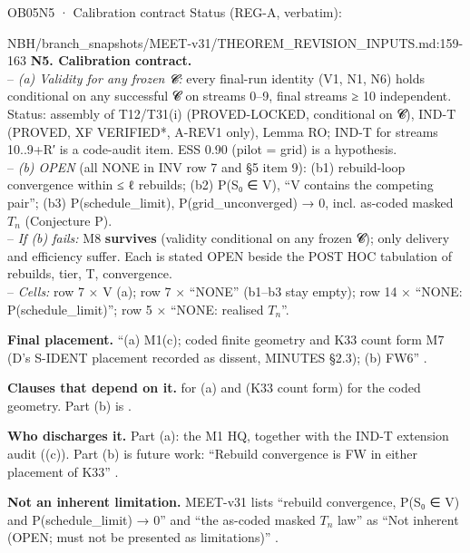 \begin{card}{OB05}{N5 · Calibration contract}
Status (REG-A, verbatim):  
\begin{stmt}{NBH/branch_snapshots/MEET-v31/THEOREM_REVISION_INPUTS.md:159-163}
\textbf{N5. Calibration contract.}\\
– \emph{(a) Validity for any frozen 𝓒:} every final-run identity (V1, N1, N6) holds conditional on any successful 𝓒 on streams 0–9, final streams ≥ 10 independent. Status: assembly of T12/T31(i) (PROVED-LOCKED, conditional on 𝓒), IND-T (PROVED, XF VERIFIED*, A-REV1 only), Lemma RO; IND-T for streams 10..9+R′ is a code-audit item. ESS 0.90 (pilot = grid) is a hypothesis.\\
– \emph{(b) OPEN} (all NONE in INV row 7 and §5 item 9): (b1) rebuild-loop convergence within ≤ ℓ rebuilds; (b2) P(S₀ ∈ V), ``V contains the competing pair''; (b3) P(schedule\_limit), P(grid\_unconverged) → 0, incl. as-coded masked $T_n$ (Conjecture P).\\
– \emph{If (b) fails:} M8 \textbf{survives} (validity conditional on any frozen 𝓒); only delivery and efficiency suffer. Each is stated OPEN beside the POST HOC tabulation of rebuilds, tier, T, convergence.\\
– \emph{Cells:} row 7 × V (a); row 7 × ``NONE'' (b1–b3 stay empty); row 14 × ``NONE: P(schedule\_limit)''; row 5 × ``NONE: realised $T_n$''.
\end{stmt}
\textbf{Final placement.} ``(a) M1(c); coded finite geometry and K33 count form M7 (D's S-IDENT placement recorded as dissent, MINUTES §2.3); (b) FW6'' .

\textbf{Clauses that depend on it.}  for (a) and  (K33 count form) for the coded geometry. Part (b) is .

\textbf{Who discharges it.} Part (a): the M1 HQ, together with the IND-T extension audit ((c)). Part (b) is future work: ``Rebuild convergence is FW in either placement of K33'' .

\textbf{Not an inherent limitation.} MEET-v31 lists ``rebuild convergence, P(S₀ ∈ V) and P(schedule\_limit) → 0'' and ``the as-coded masked $T_n$ law'' as ``Not inherent (OPEN; must not be presented as limitations)'' .
\end{card}

